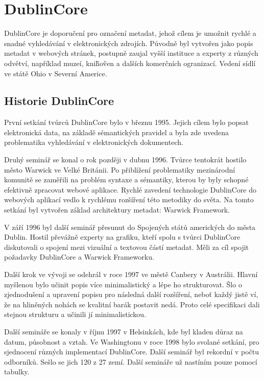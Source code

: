 \section{DublinCore}
\par DublinCore\cite{dublincoredocementation} je doporučení pro označení metadat, jehož cílem je umožnit rychlé a snadné vyhledávání v elektronických zdrojích. Původně byl vytvořen jako popis metadat v webových stránek, postupně zaujal vyšší instituce a experty z různých odvětví, například muzeí, kni\~ho\~ven a dalších komerčních ogranizací. Vedení sídlí ve státě Ohio v Severní Americe.

\subsection{Historie DublinCore}
\par První setkání tvůrců DublinCore\cite{dublincoredocementation} bylo v březnu 1995. Jejich cílem bylo popsat elektronická data, na základě sémantických pravidel a byla zde uvedena problematika vyhledávání v elektronických dokumentech.

\par Druhý seminář se konal o rok později v dubnu 1996. Tvůrce tentokrát hostilo město Warwick ve Velké Británii. Po přiblížení problematiky mezinárodní komunitě se zaměřili na problém syntaxe a sémantiky, kterou by byly schopné efektivně zpracovat webové aplikace. Rychlé zavedení technologie DublinCore do webových aplikací vedlo k rychlému rozšíření této metodiky do světa. Na tomto setkání byl vytvořen základ architektury metadat: Warwick Framework.

\par V září 1996 byl další seminář přesunut do Spojených států amerických do města Dublin. Hostil převážně experty na grafiku, kteří spolu s tvůrci DublinCore diskutovali o spojení mezi vizuální a textovou částí metadat. Měli za cíl spojit požadavky DublinCore a Warwick Frameworku.

\par Další krok ve vývoji se odehrál v roce 1997 ve městě Canbery v Austrálii. Hlavní myšlenou bylo učinit popis více minimalistický a lépe ho strukturovat. Šlo o zjednodušení a upravení popisu pro následná další rozšíření, neboť každý jistě ví, že na hliněných nohách se kvalitní barák postavit nedá. Proto celé specifikaci dali stejnou strukturu a učinili jí minimalistickou.

\par Další semináře se konaly v říjnu 1997 v Helsinkách, kde byl kladen důraz na datum, působnost a vztah. Ve Washingtonu v roce 1998 bylo svolané setkání, pro sjednocení různých implementací DublinCore. Další seminář byl rekordní v počtu odborníků. Sešlo se jich 120 z 27 zemí. Další semináře už nastíním pouze pomocí tabulky.

